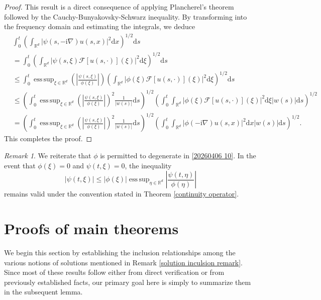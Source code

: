 \documentclass[11pt,reqno]{amsart}
\theoremstyle{definition}
\theoremstyle{remark}
\newtheorem{rem}[thm]{Remark}
\newcommand\bR{\mathbb{R}}
\newcommand\cF{\mathcal{F}}
\DeclareMathOperator*{\esssup}{ess\,sup}
\numberwithin{equation}{section}
\newcommand{\mysection}[1]{\section{#1}}
\begin{document}
\begin{proof}
This result is a direct consequence of applying Plancherel's theorem followed by the Cauchy-Bunyakovsky-Schwarz inequality. 
By transforming into the frequency domain and estimating the integrals, we deduce
\begin{align*}
 &\int_0^t \left( \int_{\bR^d}  \left| \psi(s,-\mathrm{i}\nabla) u(s,x) \right|^2 \mathrm{d}x  \right)^{1/2} \mathrm{d}s  \\
&= \int_0^t \left( \int_{\bR^d}  \left| \psi(s,\xi) \cF[u(s,\cdot)](\xi) \right|^2 \mathrm{d}\xi  \right)^{1/2} \mathrm{d}s\\
&\leq  \int_0^t  \esssup_{\xi \in \bR^d} \left(\left| \frac{\psi(s,\xi)}{\phi(\xi)} \right|\right) \left( \int_{\bR^d}  \left| \phi(\xi) \cF[u(s,\cdot)](\xi) \right|^2 \mathrm{d}\xi  \right)^{1/2} \mathrm{d}s \\
&\leq  \left(\int_0^t  \esssup_{\xi \in \bR^d} \left(\left| \frac{\psi(s,\xi)}{\phi(\xi)} \right|\right)^2\frac{1}{|w(s)|} \mathrm{d}s \right)^{1/2}
\left( \int_0^t \int_{\bR^d}  \left| \phi(\xi) \cF[u(s,\cdot)](\xi) \right|^2 \mathrm{d}\xi  |w(s)|\mathrm{d}s \right)^{1/2} \\
&=  \left(\int_0^t  \esssup_{\xi \in \bR^d} \left(\left| \frac{\psi(s,\xi)}{\phi(\xi)} \right|\right)^2 \frac{1}{|w(s)|} \mathrm{d}s \right)^{1/2}
\left( \int_0^t \int_{\bR^d}  \left| \phi(-\mathrm{i}\nabla) u(s,x) \right|^2 \mathrm{d}x |w(s)| \mathrm{d}s \right)^{1/2}.
\end{align*}
This completes the proof.
\end{proof}

\begin{rem}
										\label{degenerate operator}
We reiterate that $\phi$ is permitted to degenerate in \eqref{20260406 10}.
 In the event that $\phi(\xi)=0$ and $\psi(t,\xi)=0$, the inequality
$$
|\psi(t,\xi)| \leq  |\phi(\xi)| \esssup_{\eta \in \bR^d} \left| \frac{\psi(t,\eta)}{\phi(\eta)} \right|
$$
remains valid under the convention stated in Theorem \ref{continuity operator}. 

\end{rem}









\mysection{Proofs of main theorems}
									\label{pf main thm}



We begin this section by establishing the inclusion relationships among the various notions of solutions mentioned in Remark \ref{solution inculsion remark}. 
Since most of these results follow either from direct verification or from previously established facts, our primary goal here is simply to summarize them in the subsequent lemma.
\end{document}
